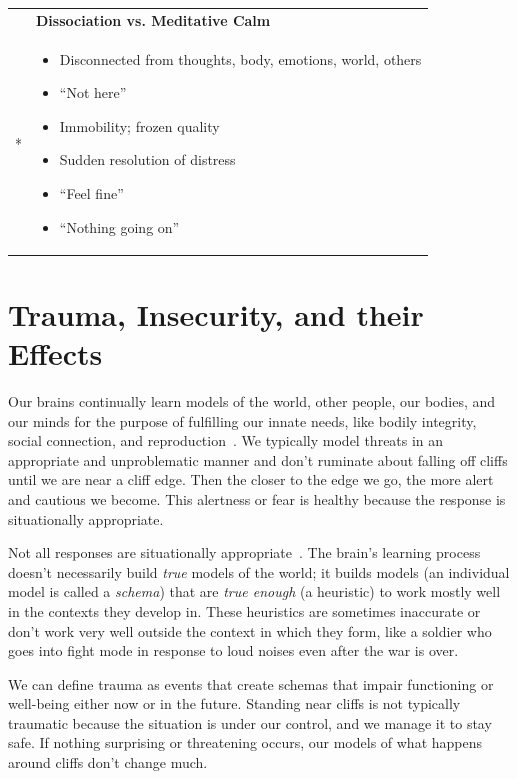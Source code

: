 \documentclass[11pt,oneside]{book}
\newenvironment{compactitemize}
{\begin{itemize}[nosep, leftmargin=1em, itemsep=0pt, topsep=0pt]}
{\end{itemize}}
\let\cite\parencite
\begin{document}
\begin{longtable}{p{}|p{}}
\addlinespace[1em]
& \textbf{Dissociation vs. Meditative Calm} \\*
&
\begin{compactitemize}
\item Disconnected from thoughts, body, emotions, world, others
\item \enquote{Not here}
\item Immobility; frozen quality
\item Sudden resolution of distress
\item \enquote{Feel fine}
\item \enquote{Nothing going on}
\end{compactitemize} \\

\end{longtable}

\section{Trauma, Insecurity, and their Effects}
\label{sec:trauma}
Our brains continually learn models of the world, other people, our bodies, and our minds for the purpose of fulfilling our innate needs, like bodily integrity, social connection, and reproduction~\cite{clark2015surfing}. We typically model threats in an appropriate and unproblematic manner and don't ruminate about falling off cliffs until we are near a cliff edge. Then the closer to the edge we go, the more alert and cautious we become. This alertness or fear is healthy because the response is situationally appropriate.

Not all responses are situationally appropriate~\cite{eckerUnlocking}. The brain's learning process doesn't necessarily build \textit{true} models of the world; it builds models (an individual model is called a \textit{schema}) that are \textit{true enough} (a heuristic) to work mostly well in the contexts they develop in. These heuristics are sometimes inaccurate or don't work very well outside the context in which they form, like a soldier who goes into fight mode in response to loud noises even after the war is over.

We can define trauma as events that create schemas that impair functioning or well-being either now or in the future. Standing near cliffs is not typically traumatic because the situation is under our control, and we manage it to stay safe. If nothing surprising or threatening occurs, our models of what happens around cliffs don't change much.
\end{document}
